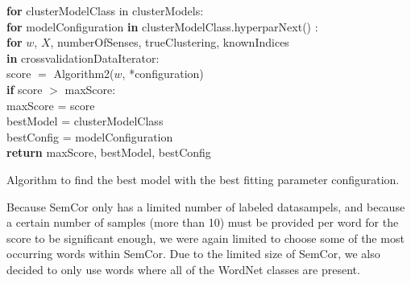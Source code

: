 \documentclass[a4paper,12pt,oneside,openright]{report}
\begin{document}
\begin{algorithm}[H]
\SetAlgoLined
{}

\textbf{for} clusterModelClass in clusterModels:  \\
\quad \quad \textbf{for} modelConfiguration \textbf{in} clusterModelClass.hyperparNext() :  \\
\quad \quad \quad \quad \textbf{for} $w$, $X$, numberOfSenses, trueClustering, knownIndices \\
\quad \quad \quad \quad \textbf{in} crossvalidationDataIterator:  \\

\quad \quad \quad \quad \quad \quad score $=$ Algorithm2($w$, *configuration) \\
\quad \quad \quad \quad \quad \quad \textbf{if} score $>$ maxScore: \\
\quad \quad \quad \quad \quad \quad \quad \quad  maxScore = score \\
\quad \quad \quad \quad \quad \quad \quad \quad  bestModel = clusterModelClass \\
\quad \quad \quad \quad \quad \quad \quad \quad  bestConfig = modelConfiguration \\

\textbf{return} maxScore, bestModel, bestConfig
  \label{alg:cluster_hyperparameters}
 \caption{Algorithm to find the best model with the best fitting parameter configuration.}
\end{algorithm}

\hfill \break

Because SemCor only has a limited number of labeled datasampels, and because a certain number of samples (more than 10) must be provided per word for the score to be significant enough, we were again limited to choose some of the most occurring words within SemCor.
Due to the limited size of SemCor, we also decided to only use words where all of the WordNet classes are present.
\end{document}
